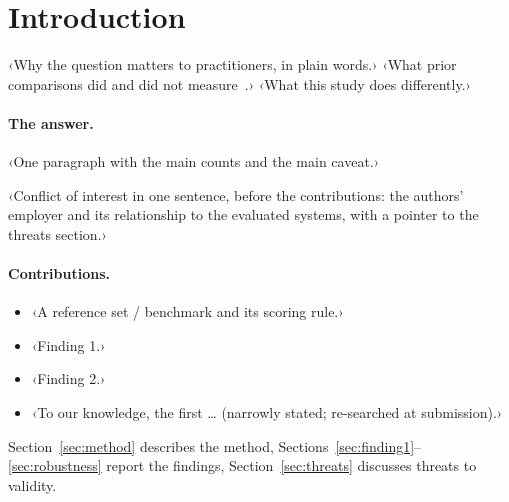 \section{Introduction}
\label{sec:intro}

‹Why the question matters to practitioners, in plain words.› ‹What prior comparisons did and did not measure~\citep{key2026example}.› ‹What this study does differently.›

\paragraph{The answer.} ‹One paragraph with the main counts and the main caveat.›

‹Conflict of interest in one sentence, before the contributions: the authors' employer and its relationship to the evaluated systems, with a pointer to the threats section.›

\paragraph{Contributions.}
\begin{itemize}
  \item ‹A reference set / benchmark and its scoring rule.›
  \item ‹Finding 1.›
  \item ‹Finding 2.›
  \item ‹To our knowledge, the first … (narrowly stated; re-searched at submission).›
\end{itemize}

Section~\ref{sec:method} describes the method, Sections~\ref{sec:finding1}--\ref{sec:robustness} report the findings, Section~\ref{sec:threats} discusses threats to validity.

